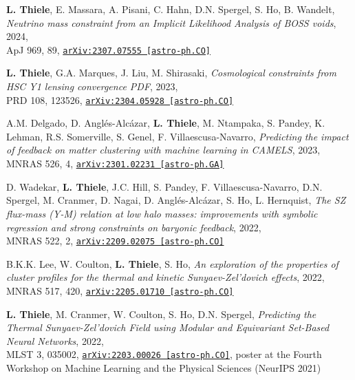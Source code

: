 \begin{minipage}{\textwidth}
{\bf L. Thiele}, E. Massara, A. Pisani, C. Hahn, D.N. Spergel, S. Ho, B. Wandelt,
\emph{Neutrino mass constraint from an Implicit Likelihood Analysis of BOSS voids}, 2024,\\
ApJ 969, 89,
\href{https://arxiv.org/abs/2307.07555}{\mbox{\texttt{arXiv:2307.07555 [astro-ph.CO]}}}
\end{minipage}

\begin{minipage}{\textwidth}
{\bf L. Thiele}, G.A. Marques, J. Liu, M. Shirasaki,
\emph{Cosmological constraints from HSC Y1 lensing convergence PDF}, 2023,\\
PRD 108, 123526,
\href{https://arxiv.org/abs/2304.05928}{\mbox{\texttt{arXiv:2304.05928 [astro-ph.CO]}}}
\end{minipage}

\begin{minipage}{\textwidth}
A.M. Delgado, D. Angl\'es-Alc\'azar, {\bf L. Thiele}, M. Ntampaka, S. Pandey,
K. Lehman, R.S. Somerville, S. Genel, F. Villaescusa-Navarro,
\emph{Predicting the impact of feedback on matter clustering with machine learning
      in CAMELS}, 2023,\\
MNRAS 526, 4,
\href{https://arxiv.org/abs/2301.02231}{\mbox{\texttt{arXiv:2301.02231 [astro-ph.GA]}}}
\end{minipage}

\begin{minipage}{\textwidth}
D. Wadekar, {\bf L. Thiele}, J.C. Hill, S. Pandey, F. Villaescusa-Navarro,
D.N. Spergel, M. Cranmer, D. Nagai, D. Angl\'es-Alc\'azar, S. Ho, L. Hernquist,
\emph{The SZ flux-mass (Y-M) relation at low halo masses: improvements with
      symbolic regression and strong constraints on baryonic feedback}, 2022,\\
MNRAS 522, 2,
\href{https://arxiv.org/abs/2209.02075}{\mbox{\texttt{arXiv:2209.02075 [astro-ph.CO]}}}
\end{minipage}

\begin{minipage}{\textwidth}
B.K.K. Lee, W. Coulton, {\bf L. Thiele}, S. Ho,
\emph{An exploration of the properties of cluster profiles for the thermal
      and kinetic Sunyaev-Zel'dovich effects}, 2022,\\
MNRAS 517, 420,
\href{https://arxiv.org/abs/2205.01710}{\mbox{\texttt{arXiv:2205.01710 [astro-ph.CO]}}}
\end{minipage}

\begin{minipage}{\textwidth}
{\bf L. Thiele}, M. Cranmer, W. Coulton, S. Ho, D.N. Spergel,
\emph{Predicting the Thermal Sunyaev-Zel'dovich Field
      using Modular and Equivariant Set-Based Neural Networks}, 2022,\\
MLST 3, 035002,
\href{https://arxiv.org/abs/2203.00026}{\mbox{\texttt{arXiv:2203.00026 [astro-ph.CO]}}},
poster at the Fourth Workshop on Machine Learning and the Physical Sciences (NeurIPS 2021)
\end{minipage}

